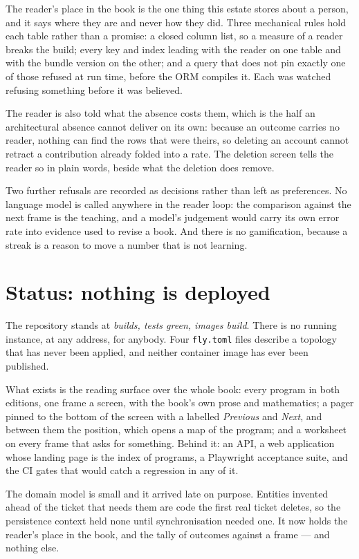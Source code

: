\documentclass[11pt,a4paper]{article}
\begin{document}
The reader's place in the book is the one thing this estate stores about a person, and it
says where they are and never how they did. Three mechanical rules hold each table rather
than a promise: a closed column list, so a measure of a reader breaks the build; every key
and index leading with the reader on one table and with the bundle version on the other; and
a query that does not pin exactly one of those refused at run time, before the ORM compiles
it. Each was watched refusing something before it was believed.

The reader is also told what the absence costs them, which is the half an architectural
absence cannot deliver on its own: because an outcome carries no reader, nothing can find
the rows that were theirs, so deleting an account cannot retract a contribution already
folded into a rate. The deletion screen tells the reader so in plain words, beside what the
deletion does remove.

Two further refusals are recorded as decisions rather than left as preferences. No language
model is called anywhere in the reader loop: the comparison against the next frame is the
teaching, and a model's judgement would carry its own error rate into evidence used to
revise a book. And there is no gamification, because a streak is a reason to move a number
that is not learning.

\section{Status: nothing is deployed}

The repository stands at \emph{builds, tests green, images build}. There is no running
instance, at any address, for anybody. Four \texttt{fly.toml} files describe a topology that
has never been applied, and neither container image has ever been published.

What exists is the reading surface over the whole book: every program in both editions, one
frame a screen, with the book's own prose and mathematics; a pager pinned to the bottom of
the screen with a labelled \emph{Previous} and \emph{Next}, and between them the position,
which opens a map of the program; and a worksheet on every frame that asks for something. Behind it: an API, a web application whose landing page is the index of programs,
a Playwright acceptance suite, and the CI gates that would catch a regression in any of it.

The domain model is small and it arrived late on purpose. Entities invented ahead of the
ticket that needs them are code the first real ticket deletes, so the persistence context
held none until synchronisation needed one. It now holds the reader's place in the book, and
the tally of outcomes against a frame --- and nothing else.
\end{document}
